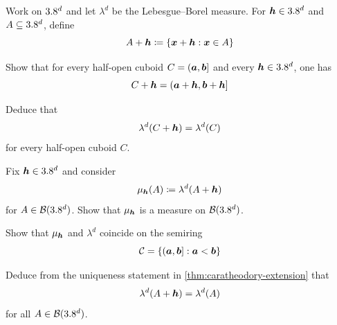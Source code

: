 \begin{exercise} %
Work on $3.8^d$ and let $\lambda^d$ be the Lebesgue--Borel measure.
For ${\boldsymbol{h}} \in 3.8^d$ and $A \subseteq 3.8^d$, define
\[
A+{\boldsymbol{h}}
\coloneq
\{{\boldsymbol{x}}+{\boldsymbol{h}} : {\boldsymbol{x}} \in A\}
\]
\begin{enumerate}[label={\protect\hyperref[solitem:translation-invariance-cuboids:\arabic*]{(\alph*)}}]
\item \label{exitem:translation-invariance-cuboids:1}
Show that for every half-open cuboid $C=({\boldsymbol{a}},{\boldsymbol{b}}]$ and every ${\boldsymbol{h}} \in 3.8^d$, one has
\[
C+{\boldsymbol{h}}
=
({\boldsymbol{a}}+{\boldsymbol{h}},{\boldsymbol{b}}+{\boldsymbol{h}}]
\]
\item \label{exitem:translation-invariance-cuboids:2}
Deduce that
\[
\lambda^d(C+{\boldsymbol{h}})
=
\lambda^d(C)
\]
for every half-open cuboid $C$.
\item \label{exitem:translation-invariance-cuboids:3}
Fix ${\boldsymbol{h}}\in3.8^d$ and consider
\[
\mu_{{\boldsymbol{h}}}(A)
\coloneq
\lambda^d(A+{\boldsymbol{h}})
\]
for 
$
A \in \mathcal{B}(3.8^d)
$.
Show that $\mu_{{\boldsymbol{h}}}$ is a measure on $\mathcal{B}(3.8^d)$.
\item \label{exitem:translation-invariance-cuboids:4}
Show that $\mu_{{\boldsymbol{h}}}$ and $\lambda^d$ coincide on the semiring
\[
\mathcal{C}
=
\{({\boldsymbol{a}},{\boldsymbol{b}}] : {\boldsymbol{a}}<{\boldsymbol{b}}\}
\]
\item \label{exitem:translation-invariance-cuboids:5}
Deduce from the uniqueness statement in \autoref{thm:caratheodory-extension} that
\[
\lambda^d(A+{\boldsymbol{h}})
=
\lambda^d(A)
\]
for all $A \in \mathcal{B}(3.8^d)$.
\qedhere
\end{enumerate}
\end{exercise}

